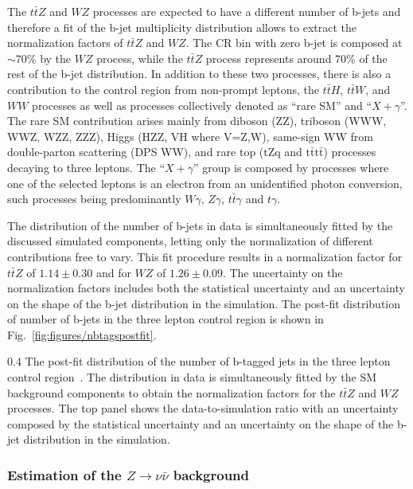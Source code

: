 The $t\bar{t}Z$ and  $WZ$ processes are expected to have a different number of b-jets and  therefore a fit of the b-jet multiplicity distribution allows to extract the normalization factors of $t\bar{t}Z$ and $WZ$. The CR bin with zero b-jet  is composed at $\sim$70\% by the $WZ$ process, while the $t\bar{t}Z$ process represents around 70\% of the rest of the b-jet distribution. In addition to these two processes, there is also a contribution to the control region from non-prompt leptons, the $t\bar{t}H$,   $t\bar{t}W$, and $WW$ processes as well as processes collectively denoted as ``rare SM'' and ``$X+\gamma$''. The rare SM contribution arises mainly from diboson (ZZ), triboson (WWW, WWZ, WZZ, ZZZ), Higgs (HZZ, VH where V=Z,W), same-sign WW from double-parton scattering (DPS WW), and rare top (tZq and $\mathrm{t\bar{t}t\bar{t}}$) processes decaying to three leptons. The ``$X+\gamma$'' group is composed by processes where one of the selected leptons is an electron from an unidentified photon conversion, such processes being predominantly $W\gamma$, $Z\gamma$, $t\bar{t}\gamma$ and $t\gamma$.

The distribution of the number of b-jets in data is simultaneously fitted by the discussed simulated components, letting only the normalization of different contributions free to vary. This fit procedure results in a normalization factor for $t\bar{t}Z$ of $1.14 \pm 0.30$ and for $WZ$ of $1.26 \pm 0.09$. The uncertainty on the normalization factors includes both the statistical uncertainty and an uncertainty on the shape of the b-jet distribution in the simulation. The post-fit distribution of number of b-jets in the three lepton control region is shown in Fig.~\ref{fig:figures/nbtagspostfit}.

                 {0.4}       %
                 { The post-fit distribution of the number of b-tagged jets in the three lepton control region~\cite{Sirunyan:2017uyt}. The distribution in data is simultaneously fitted by the SM background components to obtain the normalization factors for the $t\bar{t}Z$ and $WZ$ processes. The top panel shows the data-to-simulation ratio with an uncertainty composed by the statistical uncertainty and an uncertainty on the shape of the b-jet distribution in the simulation.  }

\subsubsection{Estimation of the $Z \to \nu \bar{\nu}$ background }

